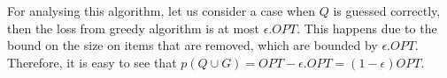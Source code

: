 For analysing this algorithm, let us consider a case when $Q$ is guessed correctly, then the loss from greedy algorithm is at most $\epsilon.OPT$.
This happens due to the bound on the size on items that are removed, which are bounded by $\epsilon.OPT$.
Therefore, it is easy to see that $p(Q \cup G) = OPT - \epsilon.OPT = (1-\epsilon)OPT$.
% 
% 
% 
% 
% 
